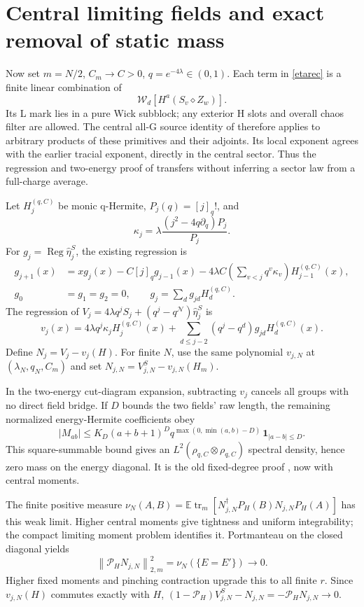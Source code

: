 \documentclass[11pt]{article}
\newcommand{\E}{\mathbb E}
\newcommand{\tr}{\operatorname{tr}}
\newcommand{\Wick}{\mathcal W}
\newcommand{\Ncal}{\mathcal N}
\newcommand{\Pin}{\mathcal P_H}
\newcommand{\norm}[1]{\left\lVert#1\right\rVert}
\newcommand{\eh}{\widehat\eta}
\begin{document}
\newpage
\section{Central limiting fields and exact removal of static mass}
Now set $m=N/2$, $C_m\to C>0$, $q=e^{-4\lambda}\in(0,1)$.
Each term in \eqref{etarec} is a finite linear combination of
\[
 \Wick_d[H^a(S_v\diamond Z_w)] .
\]
Its L mark lies in a pure Wick subblock; any exterior H slots and
overall chaos filter are allowed. The central all-G source identity
of \cite{higher} therefore applies to arbitrary products of these
primitives and their adjoints. Its local exponent agrees with the
earlier tracial exponent, directly in the central sector. Thus the
regression and two-energy proof of \cite{desc} transfers without
inferring a sector law from a full-charge average.

Let $H_j^{(q,C)}$ be monic q-Hermite, $P_j(q)=[j]_q!$, and
\[
 \kappa_j=\lambda\frac{(j^2-4q\partial_q)P_j}{P_j}.
\]
For $g_j=\operatorname{Reg}\eh_j^S$, the existing regression is
\begin{align*}
 g_{j+1}(x)&=xg_j(x)-C[j]_qg_{j-1}(x)
 -4\lambda C\left(\sum_{v<j}q^v\kappa_v\right)H_{j-1}^{(q,C)}(x),\\
 g_0&=g_1=g_2=0,\qquad g_j=\sum_dg_{jd}H_d^{(q,C)} .
\end{align*}
The regression of $V_j=4\lambda q^jS_j+(q^j-q^\Ncal)\eh_j^S$ is
\[
 v_j(x)=4\lambda q^j\kappa_jH_j^{(q,C)}(x)
           +\sum_{d\le j-2}(q^j-q^d)g_{jd}H_d^{(q,C)}(x).
\]
Define $N_j=V_j-v_j(H)$. For finite $N$, use the same polynomial
$v_{j,N}$ at $(\lambda_N,q_N,C_m)$ and set
$N_{j,N}=V_{j,N}^S-v_{j,N}(H_m)$.

In the two-energy cut-diagram expansion, subtracting $v_j$ cancels
all groups with no direct field bridge. If $D$ bounds the two fields'
raw length, the remaining normalized energy-Hermite coefficients obey
\[
 |M_{ab}|\le K_D(a+b+1)^D
 q^{\max(0,\min(a,b)-D)}\,\mathbf1_{|a-b|\le D}.
\]
This square-summable bound gives an $L^2(\rho_{q,C}\otimes\rho_{q,C})$
spectral density, hence zero mass on the energy diagonal.
It is the old fixed-degree proof \cite{desc}, now with central moments.

The finite positive measure
$\nu_N(A,B)=\E\tr_m[N_{j,N}^\dagger P_H(B)N_{j,N}P_H(A)]$
has this weak limit. Higher central moments give tightness and uniform
integrability; the compact limiting moment problem identifies it.
Portmanteau on the closed diagonal yields
\[
 \norm{\Pin N_{j,N}}_{2,m}^2=\nu_N(\{E=E'\})\longrightarrow0.
\]
Higher fixed moments and pinching contraction upgrade this to all
finite $r$. Since $v_{j,N}(H)$ commutes exactly with $H$,
$(1-\Pin)V_{j,N}^S-N_{j,N}=-\Pin N_{j,N}\to0$.
\end{document}
